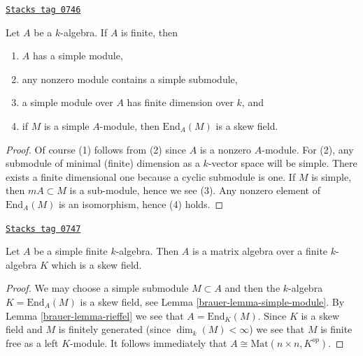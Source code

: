 \begin{lemma}
\label{brauer-lemma-simple-module}
\href{https://stacks.math.columbia.edu/tag/0746}{\texttt{Stacks tag 0746}}

Let $A$ be a $k$-algebra. If $A$ is finite, then
\begin{enumerate}
\item $A$ has a simple module,
\item any nonzero module contains a simple submodule,
\item a simple module over $A$ has finite dimension over $k$, and
\item if $M$ is a simple $A$-module, then $\text{End}_A(M)$ is a
skew field.
\end{enumerate}
\end{lemma}

\begin{proof}
Of course (1) follows from (2) since $A$ is a nonzero $A$-module.
For (2), any submodule of minimal (finite) dimension as a $k$-vector
space will be simple. There exists a finite dimensional one
because a cyclic submodule is one. If $M$ is simple, then
$mA \subset M$ is a sub-module, hence we see (3). Any nonzero element
of $\text{End}_A(M)$ is an isomorphism, hence (4) holds.
\end{proof}

\begin{theorem}
\label{brauer-theorem-wedderburn}
\href{https://stacks.math.columbia.edu/tag/0747}{\texttt{Stacks tag 0747}}


Let $A$ be a simple finite $k$-algebra. Then $A$ is a matrix algebra over
a finite $k$-algebra $K$ which is a skew field.
\end{theorem}

\begin{proof}

We may choose a simple submodule $M \subset A$ and then
the $k$-algebra $K = \text{End}_A(M)$ is a skew field, see
Lemma \ref{brauer-lemma-simple-module}.
By
Lemma \ref{brauer-lemma-rieffel}
we see that $A = \text{End}_K(M)$. Since $K$ is a skew field and
$M$ is finitely generated (since $\dim_k(M) < \infty$) we see that
$M$ is finite free as a left $K$-module. It follows immediately that
$A \cong \text{Mat}(n \times n, K^{op})$.
\end{proof}

